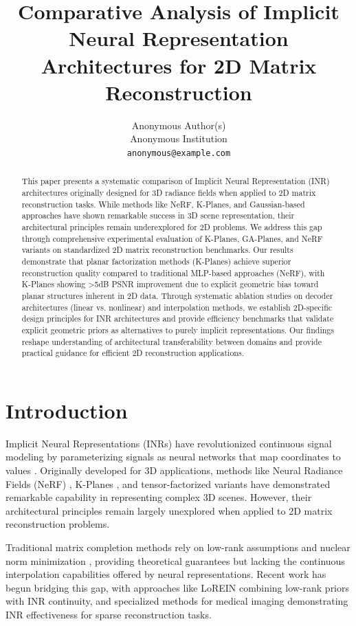 \documentclass{article}
\title{Comparative Analysis of Implicit Neural Representation Architectures for 2D Matrix Reconstruction}
\author{
  Anonymous Author(s)\\
  Anonymous Institution\\
  \texttt{anonymous@example.com}
}
\begin{document}
\maketitle

\begin{abstract}
This paper presents a systematic comparison of Implicit Neural Representation (INR) architectures originally designed for 3D radiance fields when applied to 2D matrix reconstruction tasks. While methods like NeRF, K-Planes, and Gaussian-based approaches have shown remarkable success in 3D scene representation, their architectural principles remain underexplored for 2D problems. We address this gap through comprehensive experimental evaluation of K-Planes, GA-Planes, and NeRF variants on standardized 2D matrix reconstruction benchmarks. Our results demonstrate that planar factorization methods (K-Planes) achieve superior reconstruction quality compared to traditional MLP-based approaches (NeRF), with K-Planes showing >5dB PSNR improvement due to explicit geometric bias toward planar structures inherent in 2D data. Through systematic ablation studies on decoder architectures (linear vs. nonlinear) and interpolation methods, we establish 2D-specific design principles for INR architectures and provide efficiency benchmarks that validate explicit geometric priors as alternatives to purely implicit representations. Our findings reshape understanding of architectural transferability between domains and provide practical guidance for efficient 2D reconstruction applications.
\end{abstract}

\section{Introduction}

Implicit Neural Representations (INRs) have revolutionized continuous signal modeling by parameterizing signals as neural networks that map coordinates to values \cite{mildenhall2020nerf,sitzmann2020siren}. Originally developed for 3D applications, methods like Neural Radiance Fields (NeRF) \cite{mildenhall2020nerf}, K-Planes \cite{fridovich2023kplanes}, and tensor-factorized variants \cite{chen2022tensorf} have demonstrated remarkable capability in representing complex 3D scenes. However, their architectural principles remain largely unexplored when applied to 2D matrix reconstruction problems.

Traditional matrix completion methods rely on low-rank assumptions and nuclear norm minimization \cite{candes2009matrix,recht2011simpler}, providing theoretical guarantees but lacking the continuous interpolation capabilities offered by neural representations. Recent work has begun bridging this gap, with approaches like LoREIN \cite{zhang2025lorein} combining low-rank priors with INR continuity, and specialized methods for medical imaging \cite{shi2024inr,rao2025cristal} demonstrating INR effectiveness for sparse reconstruction tasks.
\end{document}
